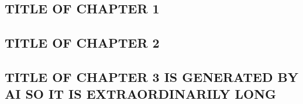 \documentclass[12pt,letterpaper]{uncdissertation}
\begin{document}
\begin{doublespace}
\cleardoublepage
{}

\begin{singlespace}
\chapter{TITLE OF CHAPTER 1}
\end{singlespace}\label{chap1}





\begin{singlespace}
\chapter{TITLE OF CHAPTER 2}\label{chap2}
\end{singlespace}





\begin{singlespace}
\chapter{TITLE OF CHAPTER 3 IS GENERATED BY AI SO IT IS EXTRAORDINARILY LONG}\label{chap3}
\end{singlespace}








\titlespacing{\chapter}{0pt}{-.375in}{12pt} %

\appendix
\renewcommand{\appendixname}{APPENDIX}
\renewcommand{\cftchappresnum}{APPENDIX\ }
\renewcommand{\cftchapaftersnum}{:\ }
\settowidth{\cftchapnumwidth}{APPENDIX D:\ }


\end{doublespace}
\end{document}
